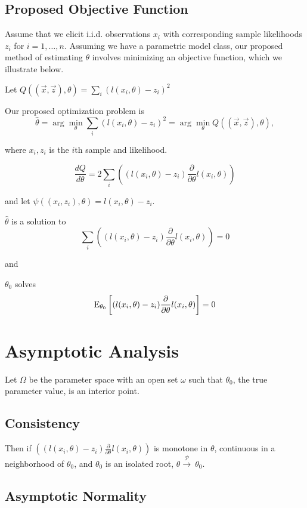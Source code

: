 \subsection*{Proposed Objective Function}

Assume that we elicit i.i.d. observations $x_i$ with corresponding sample likelihoods $z_i$ for $i=1,\ldots,n$. Assuming we have a parametric model class, our proposed method of estimating $\theta$ involves minimizing an objective function, which we illustrate below.

Let $Q((\vec{x},\vec{z}),\theta)=\sum_i \left( l(x_i,\theta)-z_i \right)^2$

Our proposed optimization problem is $$
\hat{\theta} = \arg \min_{\theta} \sum_i \left( l(x_i,\theta)-z_i \right)^2 = \arg \min_{\theta} Q((\vec{x},\vec{z}), \theta),$$

where $x_i,z_i$ is the $i$th sample and likelihood.

$$\frac{dQ}{d\theta} = 2 \sum_i \left( (l(x_i,\theta)-z_i) \frac{\partial}{\partial \theta}l(x_i,\theta)\right) $$

and let $\psi((x_i,z_i),\theta)=l(x_i,\theta)-z_i.$

$\hat{\theta}$ is a solution to $$\sum_i \left( (l(x_i,\theta)-z_i) \frac{\partial}{\partial \theta}l(x_i,\theta)\right) = 0$$

and

$\theta_0$ solves $$\mathrm{E}_{\theta_0}\left[(l(x_i,\theta)-z_i) \frac{\partial}{\partial \theta}l(x_i,\theta)\right]=0$$

\section*{Asymptotic Analysis}

Let $\Omega$ be the parameter space with an open set $\omega$ such that $\theta_0$, the true parameter value, is an interior point.

\subsection*{Consistency}

Then if $\left( (l(x_i,\theta)-z_i) \frac{\partial}{\partial \theta}l(x_i,\theta)\right)$ is monotone in $\theta$, continuous in a neighborhood of $\theta_0$, and $\theta_0$ is an isolated root, $\hat{\theta} \xrightarrow{\mathcal{P}}\ \theta_0$.

\subsection*{Asymptotic Normality}

